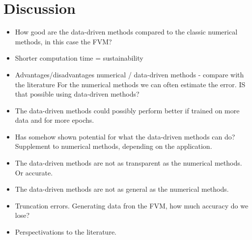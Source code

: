 \chapter{Discussion}\label{ch:discussion}

\begin{itemize}
    \item How good are the data-driven methods compared to the classic numerical methods, in this case the FVM?
    \item Shorter computation time = sustainability
    \item Advantages/disadvantages numerical / data-driven methods - compare with the literature 
    For the numerical methods we can often estimate the error. IS that possible using data-driven methods?
    \item The data-driven methods could possibly perform better if trained on more data and for more epochs. 
    \item Has somehow shown potential for what the data-driven methods can do? Supplement to numerical methods, depending on the application.
    \item The data-driven methods are not as transparent as the numerical methods. Or accurate.
    \item The data-driven methods are not as general as the numerical methods.
    \item Truncation errors. Generating data fron the FVM, how much accuracy do we lose?
    \item Perspectivations to the literature.
\end{itemize}



